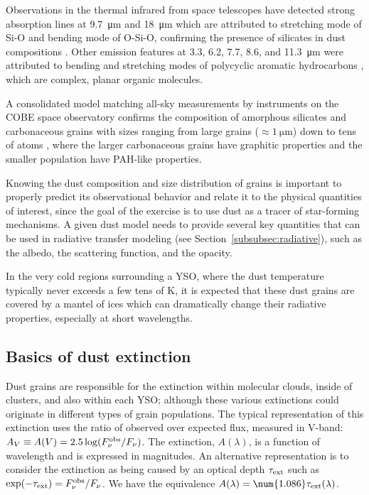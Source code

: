 Observations in the thermal infrared from space telescopes have detected strong absorption lines at \SI{9.7}{\micro\meter} and \SI{18}{\micro\meter} which are attributed to stretching mode of Si-O and bending mode of O-Si-O, confirming the presence of silicates in dust compositions \citep{Weingartner:2001du}. Other emission features at 3.3, 6.2, 7.7, 8.6, and \SI{11.3}{\micro\meter} \citep{Sellgren:1994vz} were attributed to bending and stretching modes of polycyclic aromatic hydrocarbons \citep[PAH, see][]{Gillett:1973bh,Allamandola:1985cf}, which are complex, planar organic molecules.
 
A consolidated model matching all-sky measurements by instruments on the COBE space observatory confirms the composition of amorphous silicates and carbonaceous grains with sizes ranging from large grains ($\approx\SI{1}{\micro\meter}$) down to tens of atoms \citep{Li:2001gk}, where the larger carbonaceous grains have graphitic properties and the smaller population have PAH-like properties.






Knowing the dust composition and size distribution of grains is important to properly predict its observational behavior and relate it to the physical quantities of interest, since the goal of the exercise is to use dust as a tracer of star-forming mechanisms. A given dust model needs to provide several key quantities that can be used in radiative transfer modeling (see Section~\ref{subsubsec:radiative}), such as the albedo, the scattering function, and the opacity.

In the very cold regions surrounding a YSO, where the dust temperature typically never exceeds a few tens of \si{\kelvin}, it is expected that these dust grains are covered by a mantel of ices which can dramatically change their radiative properties, especially at short wavelengths. 

\subsection{Basics of dust extinction}
\label{subsec:DustExtinction}

Dust grains are responsible for the extinction within molecular clouds, inside of clusters, and also within each YSO; although these various extinctions could originate in different types of grain populations. The typical representation of this extinction uses the ratio of observed over expected flux, measured in V-band: $A_V \equiv A(V) = 2.5\log(F_\nu^\textrm{obs}/F_\nu)$. The extinction, $A(\lambda)$, is a function of wavelength and is expressed in magnitudes. An alternative representation is to consider the extinction as being caused by an optical depth $\tau_\textrm{ext}$ such as $\exp(-\tau_\textrm{ext}) = F_\nu^\textrm{obs}/F_\nu$. We have the equivalence $A(\lambda) = \num{1.086}\tau_\ext(\lambda)$.

